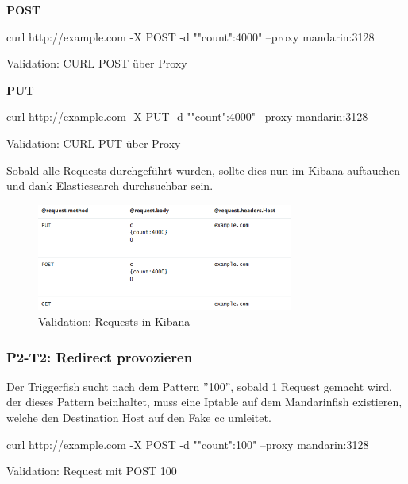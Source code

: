 \begin{listing}[H]
\textbf{POST}\\
\begin{fancycode}
curl http://example.com -X POST -d "{"count":4000}" --proxy mandarin:3128
\end{fancycode}
\caption{Validation: CURL POST über Proxy}
\label{lst:curl-post-proxy}
\end{listing}

\begin{listing}[H]
\textbf{PUT}\\
\begin{fancycode}
curl http://example.com -X PUT -d "{"count":4000}" --proxy mandarin:3128
\end{fancycode}
\caption{Validation: CURL PUT über Proxy}
\label{lst:curl-put-proxy}
\end{listing}

Sobald alle Requests durchgeführt wurden, sollte dies nun im Kibana auftauchen und dank Elasticsearch durchsuchbar sein.


\begin{figure}[H]
	\centering
	\includegraphics[width=0.75\textwidth]{img/requests-kibana}
	\caption{Validation: Requests in Kibana}
	\label{fig:kibana-request}
\end{figure}



\subsubsection{P2-T2: Redirect provozieren}
Der Triggerfish sucht nach dem Pattern ''100'', sobald 1 Request gemacht wird, der dieses Pattern beinhaltet, muss eine Iptable auf dem Mandarinfish existieren, welche den Destination Host auf den Fake \gls{cc} umleitet.

\begin{listing}[H]
\begin{fancycode}
curl http://example.com -X POST -d "{"count":100}" --proxy mandarin:3128
\end{fancycode}
\caption{Validation: Request mit POST 100}
\label{lst:request-post-100}
\end{listing}

